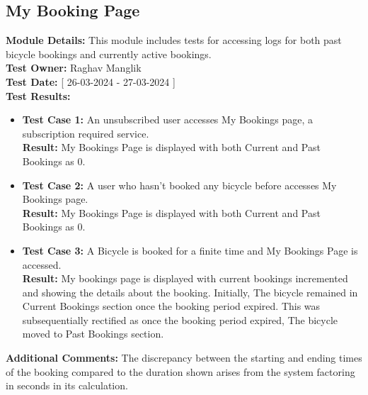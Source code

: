 \documentclass[11pt]{article}
\begin{document}
\subsection{My Booking Page}
\textbf{Module Details: }This module includes tests for accessing logs for both past bicycle bookings and currently active bookings.
\\
\textbf{Test Owner: }Raghav Manglik
\\
\textbf{Test Date: }[ 26-03-2024 - 27-03-2024 ]
\\
\textbf{Test Results: }
\begin{itemize}
    \item \textbf{Test Case 1: }An unsubscribed user accesses My Bookings page, a subscription required service.
    \\
    \textbf{Result: }My Bookings Page is displayed with both Current and Past Bookings as 0.
    \item \textbf{Test Case 2: }A user who hasn't booked any bicycle before accesses My Bookings page.
    \\
    \textbf{Result: }My Bookings Page is displayed with both Current and Past Bookings as 0.
    \item \textbf{Test Case 3: }A Bicycle is booked for a finite time and My Bookings Page is accessed.
    \\
    \textbf{Result: }My bookings page is displayed with current bookings incremented and showing the details about the booking. Initially, The bicycle remained in Current Bookings section once the booking period expired. This was subsequentially rectified as once the booking period expired, The bicycle moved to Past Bookings section.

\end{itemize}
\textbf{Additional Comments: }The discrepancy between the starting and ending times of the booking compared to the duration shown arises from the system factoring in seconds in its calculation.
\end{document}
